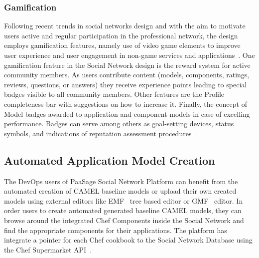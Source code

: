 \subsubsection{Gamification}
Following recent trends in social networks design and with the aim to motivate users active and regular participation in
the professional network, the design employs gamification features, namely use of video game elements to improve user experience and user engagement in non-game services and applications~\cite{deterding2011gamification}. One gamification feature in the Social Network design is the reward system for active community members. As users contribute content (models, components, ratings, reviews, questions, or answers) they receive experience points leading to special badges visible to all community members. Other features are the Profile completeness bar with suggestions on how to increase it. Finally, the concept of Model badges awarded to application and component models in case of excelling performance. Badges can serve among others as goal-setting devices, status symbols, and indications of reputation assessment procedures~\cite{antin2011badges}.

\subsection{Automated Application Model Creation}
\label{sec:automatedcreation}
The DevOps users of PaaSage Social Network Platform can benefit from the automated creation of CAMEL baseline models or upload their own created models using external editors like EMF~\cite{cdomodel} tree based editor or GMF~\cite{gmf_url} editor. In order users to create automated generated baseline CAMEL models, they can browse around the integrated Chef Components inside the Social Network and find the appropriate components for their applications. The platform has integrate a pointer for each Chef cookbook to the Social Network Database using the Chef Supermarket API~\cite{chef_api_url}.

